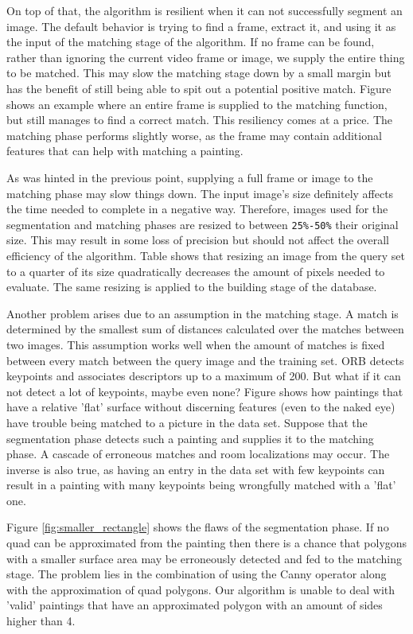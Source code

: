 On top of that, the algorithm is resilient when it can not successfully segment an image. The default behavior is trying to find a frame, extract it, and using it as the input of the matching stage of the algorithm. If no frame can be found, rather than ignoring the current video frame or image, we supply the entire thing to be matched. This may slow the matching stage down by a small margin but has the benefit of still being able to spit out a potential positive match. Figure  shows an example where an entire frame is supplied to the matching function, but still manages to find a correct match. This resiliency comes at a price. The matching phase performs slightly worse, as the frame may contain additional features that can help with matching a painting.


As was hinted in the previous point, supplying a full frame or image to the matching phase may slow things down. The input image's size definitely affects the time needed to complete in a negative way. Therefore, images used for the segmentation and matching phases are resized to between \verb|25%-50%| their original size. This may result in some loss of precision but should not affect the overall efficiency of the algorithm. Table  shows that resizing an image from the query set to a quarter of its size quadratically decreases the amount of pixels needed to evaluate. The same resizing is applied to the building stage of the database.


Another problem arises due to an assumption in the matching stage. A match is determined by the smallest sum of distances calculated over the matches between two images. This assumption works well when the amount of matches is fixed between every match between the query image and the training set. ORB detects keypoints and associates descriptors up to a maximum of 200. But what if it can not detect a lot of keypoints, maybe even none? Figure  shows how paintings that have a relative 'flat' surface without discerning features (even to the naked eye) have trouble being matched to a picture in the data set. Suppose that the segmentation phase detects such a painting and supplies it to the matching phase. A cascade of erroneous matches and room localizations may occur. The inverse is also true, as having an entry in the data set with few keypoints can result in a painting with many keypoints being wrongfully matched with a 'flat' one.


Figure \ref{fig:smaller_rectangle} shows the flaws of the segmentation phase. If no quad can be approximated from the painting then there is a chance that polygons with a smaller surface area may be erroneously detected and fed to the matching stage. The problem lies in the combination of using the Canny operator along with the approximation of quad polygons. Our algorithm is unable to deal with 'valid' paintings that have an approximated polygon with an amount of sides higher than 4.


